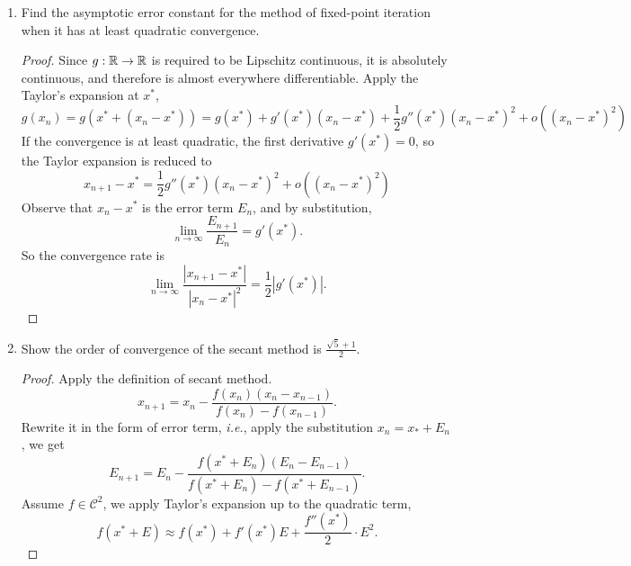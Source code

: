 \begin{enumerate}
	\begin{proof}
	Suppose the fixed point for function $g$ is
	\[ g(x^*)=x^*. \]
	The iteration gives
	\[ \forall n\in\N^*,\quad x_{n+1}=g(x_n). \]
	If the iteration converges, according to \ref{fixedpoint}, we have
	\[ \lim_{n\to\infty} x_n=x^*. \]
	The linear convergence comes directly from the definition of Lipschitz continuity.
	Lipschitz continuity ensures that
	\[ |g(x_{n})-g(x^*)|\leq c\cdot|x_n-x^*|, \]
	where \(0<c<1\) is the Lipschitz constant.
	Apply substitutions, we obtain
	\[ |x_{n+1}-x^*|\leq c\cdot|x_n-x^*| \]
	Apply the definition of error term,
	\[ E_{n+1}\leq c\cdot E_n. \]
	Since this is true for all \(n\in\N^*\), we have the limit
	\[ \lim_{n\to\infty} \frac{E_{n+1}}{E_n}\leq c. \]
	So the linear convergence is proved.
	\end{proof}
	\item Find the asymptotic error constant for the method of fixed-point iteration when it has at least quadratic convergence.
	\begin{proof}
	Since \(g:\mathbb{R}\to\mathbb{R}\) is required to be Lipschitz continuous, it is absolutely continuous, and therefore is almost everywhere differentiable.
	Apply the Taylor's expansion at \(x^*\),
	\[ g(x_n)=g(x^*+(x_n-x^*))=g(x^*)+g'(x^*)(x_n-x^*)+\frac{1}{2}g''(x^*)(x_n-x^*)^2+o\left((x_n-x^*)^2\right) \]
	If the convergence is at least quadratic, the first derivative \(g'(x^*)=0\), so the Taylor expansion is reduced to
	\[ x_{n+1}-x^*=\frac{1}{2}g''(x^*)(x_n-x^*)^2+o\left((x_n-x^*)^2\right) \]
	Observe that \(x_n-x^*\) is the error term \(E_n\), and by substitution,
	\[ \lim_{n\to\infty}\frac{E_{n+1}}{E_n} = g'(x^*). \]
	So the convergence rate is
	\[ \lim_{n\to\infty}\frac{|x_{n+1}-x^*|}{|x_{n}-x^*|^2}=\frac{1}{2}|g'(x^*)|. \]
	\end{proof}
	\item Show the order of convergence of the secant method is \(\frac{\sqrt{5}+1}{2}\).
	\begin{proof}
		Apply the definition of secant method.
		\[ x_{n+1}=x_n-\frac{f(x_n)(x_n-x_{n-1})}{f(x_n)-f(x_{n-1})}. \]
		Rewrite it in the form of error term, \textit{i.e.}, apply the substitution \(x_n=x_*+E_n\), we get
		\begin{equation}
		\label{secanterror}
		E_{n+1}=E_n-\frac{f(x^*+E_n)(E_n-E_{n-1})}{f(x^*+E_n)-f(x^*+E_{n-1})}.
		\end{equation}
		Assume \(f\in\mathcal{C}^2\), we apply Taylor's expansion up to the quadratic term,
		\[ f(x^*+E)\approx f(x^*)+f'(x^*)E+\frac{f''(x^*)}{2}\cdot E^2. \]

\end{proof}
\end{enumerate}
